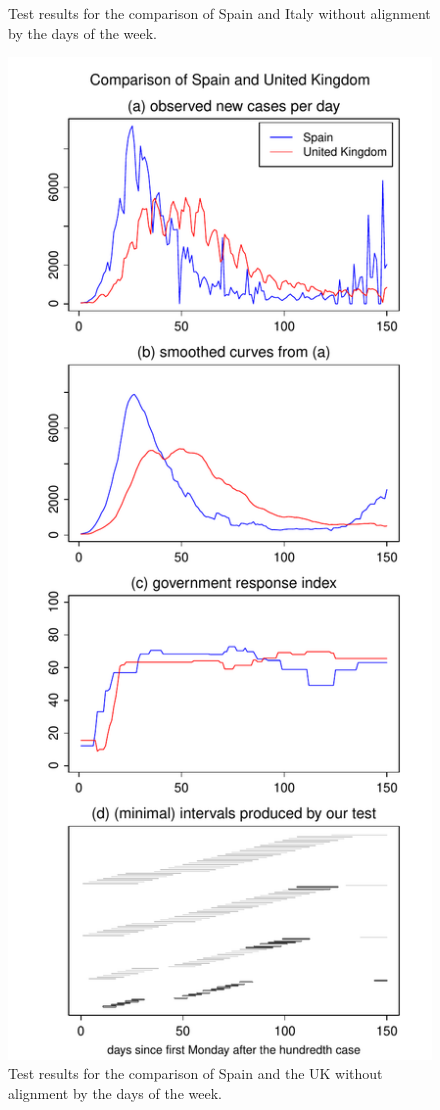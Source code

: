 \documentclass[a4paper,12pt]{article}
\numberwithin{equation}{section}
\begin{document}
{\begin{figure}[p!]
\begin{minipage}[t]{0.49\textwidth}
\caption{Test results for the comparison of Spain and Italy without alignment by the days of the week.}
\end{minipage}
\hspace{0.25cm}
\begin{minipage}[t]{0.49\textwidth}
\includegraphics[width=\textwidth]{plots/ESP_vs_GBR_wa}
\caption{Test results for the comparison of Spain and the UK without alignment by the days of the week.}
\end{minipage}
\end{figure}


}
\end{document}
